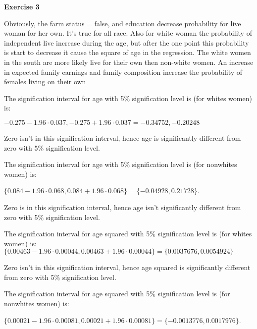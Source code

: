 \documentclass[12pt]{article}
\begin{document}
\textbf{Exercise 3}		
\begin{list}{()~}{}
\item Obviously, the farm status = false, and education decrease probability for live woman for her own. It's true for all race. Also for white woman the probability of independent live increase during the age, but after the one point this probability is start to decrease it cause the square of age in the regression. The white women in the south are more likely live for their own then non-white women. An increase in expected family earnings and family composition increase the probability of females living on their own

\item 

	\begin{list}{)~}{}
	\item The signification interval for age with 5\% signification level is (for whites women) is:

	${ -0.275 - 1.96 \cdot  0.037, -0.275 + 1.96 \cdot 0.037} = { -0.34752, -0.20248 }$

	Zero isn't in this signification interval, hence age is significantly different from zero with 5\% signification level.

	\item The signification interval for age with 5\% signification level is (for nonwhites women) is:

	$\{0.084 - 1.96 \cdot 0.068, 0.084 + 1.96 \cdot  0.068\} = \{-0.04928, 0.21728\}$.
	
	Zero is in this signification interval, hence age isn't significantly different from zero with 5\% signification level.
	
	\item  The signification interval for age squared with 5\% signification level is (for whites women) is:
	$\{0.00463-1.96 \cdot 0.00044, 0.00463 + 1.96 \cdot 0.00044\} = \{0.0037676, 0.0054924\}$
	
		Zero isn't in this signification interval, hence age squared is significantly different from zero with 5\% signification level.
	
	\item The signification interval for age squared with 5\% signification level is (for nonwhites women) is:

	$\{0.00021 - 1.96 \cdot 0.00081, 0.00021 + 1.96 \cdot 0.00081\} = \{-0.0013776, 0.0017976\}$.
	

\end{list}
\end{list}
\end{document}
